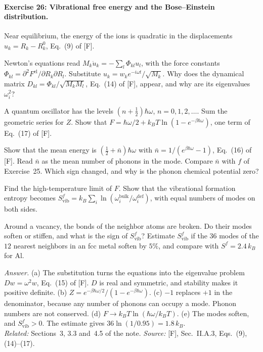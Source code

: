 \documentclass[11pt]{article}      %
\numberwithin{equation}{section}   %
\begin{document}
\paragraph{Exercise 26: Vibrational free energy and the Bose--Einstein distribution.}
Near equilibrium, the energy of the ions is quadratic in the displacements $u_k = R_k - R_k^0$, Eq.~(9) of [F].
\begin{parts}
    \item Newton's equations read $M_k\ddot u_k = -\sum_l \Phi_{kl}u_l$, with the force constants $\Phi_{kl} = \partial^2F^{\text{el}}/\partial R_k\partial R_l$. Substitute $u_k = w_ke^{-i\omega t}/\sqrt{M_k}$. Why does the dynamical matrix $D_{kl} = \Phi_{kl}/\sqrt{M_kM_l}$, Eq.~(14) of [F], appear, and why are its eigenvalues $\omega_i^2$?
    \item A quantum oscillator has the levels $(n + \tfrac12)\hbar\omega$, $n = 0, 1, 2, \dots$. Sum the geometric series for $Z$. Show that $F = \hbar\omega/2 + k_BT\ln(1 - e^{-\beta\hbar\omega})$, one term of Eq.~(17) of [F].
    \item Show that the mean energy is $(\tfrac12 + \bar n)\hbar\omega$ with $\bar n = 1/(e^{\beta\hbar\omega} - 1)$, Eq.~(16) of [F]. Read $\bar n$ as the mean number of phonons in the mode. Compare $\bar n$ with $f$ of Exercise~25. Which sign changed, and why is the phonon chemical potential zero?
    \item Find the high-temperature limit of $F$. Show that the vibrational formation entropy becomes $S^f_{\text{vib}} = k_B\sum_i\ln(\omega_i^{\text{bulk}}/\omega_i^{\text{def}})$, with equal numbers of modes on both sides.
    \item Around a vacancy, the bonds of the neighbor atoms are broken. Do their modes soften or stiffen, and what is the sign of $S^f_{\text{vib}}$? Estimate $S^f_{\text{vib}}$ if the $36$ modes of the $12$ nearest neighbors in an fcc metal soften by $5\%$, and compare with $S^f = 2.4\,k_B$ for Al.
\end{parts}
\textit{Answer.} (a) The substitution turns the equations into the eigenvalue problem $Dw = \omega^2w$, Eq.~(15) of [F]. $D$ is real and symmetric, and stability makes it positive definite. (b) $Z = e^{-\beta\hbar\omega/2}/(1 - e^{-\beta\hbar\omega})$. (c) $-1$ replaces $+1$ in the denominator, because any number of phonons can occupy a mode. Phonon numbers are not conserved. (d) $F \to k_BT\ln(\hbar\omega/k_BT)$. (e) The modes soften, and $S^f_{\text{vib}} > 0$. The estimate gives $36\ln(1/0.95) = 1.8\,k_B$.\\
\textit{Related:} Sections~3, 3.3 and~4.5 of the note. \textit{Source:} [F], Sec.~II.A.3, Eqs.~(9), (14)--(17).
\end{document}
